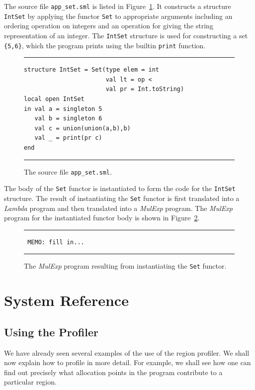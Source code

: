 \documentclass[12pt]{book}
\begin{document}
The source file {\tt app\_set.sml} is listed in
Figure~\ref{app_set.fig}. It constructs a structure {\tt IntSet} by
applying the functor {\tt Set} to appropriate arguments including an
ordering operation on integers and an operation for giving the string
representation of an integer. The {\tt IntSet} structure is used for
constructing a set \verb+{5,6}+, which the program prints using the
builtin {\tt print} function.
\begin{figure}
\hrule \medskip
\begin{verbatim}
structure IntSet = Set(type elem = int
                       val lt = op <
                       val pr = Int.toString)
local open IntSet
in val a = singleton 5
   val b = singleton 6
   val c = union(union(a,b),b)
   val _ = print(pr c)
end
\end{verbatim}
\caption{\label{app_set.fig} The source file {\tt app\_set.sml}.}
\medskip \hrule
\end{figure}

The body of the {\tt Set} functor is instantiated to form the code for
the {\tt IntSet} structure. The result of instantiating the {\tt Set}
functor is first translated into a {\sl Lambda\/} program and then
translated into a {\sl MulExp\/} program. The {\sl MulExp\/} program
for the instantiated functor body is shown in
Figure~\ref{set_inst_mulexp.fig}.
\begin{figure}
\hrule \medskip
\begin{verbatim}
 MEMO: fill in...
\end{verbatim}
\caption{\label{set_inst_mulexp.fig} The {\sl MulExp\/} program
resulting from instantiating the {\tt Set} functor.}
\medskip \hrule
\end{figure}



\part{System Reference}
%
\chapter{Using the Profiler}
%
\label{useOfProf.sec}
We have already seen several examples of the use of the region profiler. We
shall now explain how to profile in more detail. For example, we shall see
how one can find out precisely what allocation points in the program
contribute to a particular region.
\end{document}
